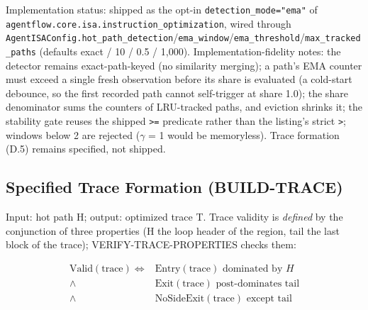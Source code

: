 \documentclass[
  11pt,
]{article}
\begin{document}
Implementation status: shipped as the opt-in
\texttt{detection\_mode="ema"} of
\texttt{agentflow.core.isa.instruction\_optimization}, wired through
\texttt{AgentISAConfig.hot\_path\_detection}/\texttt{ema\_window}/\texttt{ema\_threshold}/\texttt{max\_tracked\_paths}
(defaults exact / 10 / 0.5 / 1,000). Implementation-fidelity notes: the
detector remains exact-path-keyed (no similarity merging); a path's EMA
counter must exceed a single fresh observation before its share is
evaluated (a cold-start debounce, so the first recorded path cannot
self-trigger at share 1.0); the share denominator sums the counters of
LRU-tracked paths, and eviction shrinks it; the stability gate reuses
the shipped \texttt{\textgreater{}=} predicate rather than the listing's
strict \texttt{\textgreater{}}; windows below 2 are rejected (\(\gamma\)
= 1 would be memoryless). Trace formation (D.5) remains specified, not
shipped.

\subsection{Specified Trace Formation
(BUILD-TRACE)}\label{specified-trace-formation-build-trace}

Input: hot path H; output: optimized trace T. Trace validity is
\emph{defined} by the conjunction of three properties (H the loop header
of the region, tail the last block of the trace);
VERIFY-TRACE-PROPERTIES checks them:

\[
\begin{aligned}
\text{Valid}(\text{trace}) \iff {}& \text{Entry}(\text{trace}) \text{ dominated by } H \\
\wedge\;& \text{Exit}(\text{trace}) \text{ post-dominates tail} \\
\wedge\;& \text{NoSideExit}(\text{trace}) \text{ except tail}
\end{aligned}
\]
\end{document}
